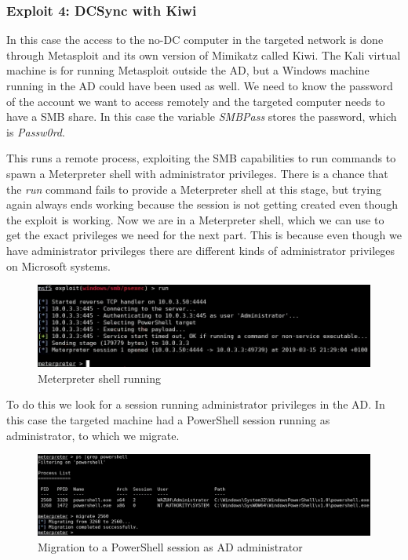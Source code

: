 \subsubsection{Exploit 4: DCSync with Kiwi}
In this case the access to the no-DC computer in the targeted network is done through Metasploit\cite{metasploit} and its own version of Mimikatz called Kiwi\cite{pentestlab}. The Kali virtual machine is for running Metasploit outside the AD, but a Windows machine running in the AD could have been used as well.
\linej
We need to know the password of the account we want to access remotely and the targeted computer needs to have a SMB share.
In this case the variable \textit{SMBPass} stores the password, which is \textit{Passw0rd}.
\linej

\linej
This runs a remote process, exploiting the SMB capabilities to run commands to spawn a Meterpreter shell\cite{meterpreter} with administrator privileges. There is a chance that the \textit{run} command fails to provide a Meterpreter shell at this stage, but trying again always ends working because the session is not getting created even though the exploit is working.
\linej
\linej
Now we are in a Meterpreter shell, which we can use to get the exact privileges we need for the next part. This is because even though we have administrator privileges there are different kinds of administrator privileges on Microsoft systems.
\begin{figure}[H]
	\centering
	\includegraphics[width=\textwidth]{figuras/meterpreter.png}
	\caption{Meterpreter shell running}
\end{figure}
\linej
To do this we look for a session running administrator privileges in the AD. In this case the targeted machine had a PowerShell session running as administrator, to which we migrate.
\linej
\begin{figure}[H]
	\centering
	\includegraphics[width=\textwidth]{figuras/migrate.png}
	\caption{Migration to a PowerShell session as AD administrator}
\end{figure}
